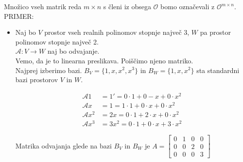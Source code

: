 \documentclass[a4paper,12pt]{article}
\begin{document}
Množico vseh matrik reda $m\times n$ s členi iz obsega $\mathcal{O}$ bomo označevali z $\mathcal{O}^{m\times n}$. \\

PRIMER:
\begin{itemize}
	\item Naj bo $V$ prostor vseh realnih polinomov stopnje največ 3, $W$ pa prostor polinomov stopnje največ 2. \\
	
	$\mathcal{A}:V\to W$ naj bo odvajanje. \\

	Vemo, da je to linearna preslikava. Poiščimo njeno matriko.\\

	Najprej izberimo bazi. $B_V=\{1,x,x^2,x^3\}$ in $B_W=\{1,x,x^2\}$ sta standardni bazi prostorov $V$ in $W$. 

\begin{align*}
	\mathcal{A}1&=1'=0\cdot 1+0-x+0\cdot x^2 \\
	\mathcal{A}x&=1=1\cdot 1 +0\cdot x+0\cdot x^2 \\
	\mathcal{A}x^2&=2x=0\cdot 1 +2\cdot x + 0 \cdot x^2 \\
	\mathcal{A}x^3&=3x^2=0\cdot 1+0\cdot x+3\cdot x^2
\end{align*}

Matrika odvajanja glede na bazi $B_V$ in $B_W$ je 
$A=
\begin{bmatrix}
	0&1&0&0\\
	0&0&2&0\\
	0&0&0&3
\end{bmatrix}$
\end{itemize}
\end{document}
